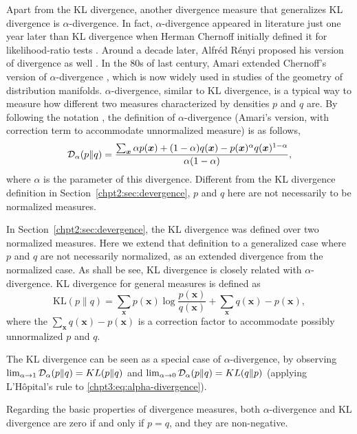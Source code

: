 Apart from the KL divergence, another divergence measure that generalizes KL divergence is $\alpha$-divergence. In fact, $\alpha$-divergence appeared in literature just one year later than KL divergence when Herman Chernoff initially defined it for likelihood-ratio tests \cite{Chernoff1952measure}. Around a decade later, Alfr\'ed R\'enyi proposed his version of divergence as well \cite{renyi1961entropy}. In the 80s of last century, Amari extended Chernoff's version of $\alpha$-divergence \cite{amari1982differential}, which is now widely used in studies of the geometry of distribution manifolds. 
$\alpha$-divergence, similar to KL divergence, is a typical way to measure how different two measures characterized by densities $p$ and $q$ are. By following the notation \cite{Zhu95informationgeometric}, the definition of $\alpha$-divergence (Amari's version, with correction term to accommodate unnormalized measure) is as follows,
\begin{equation}\label{chpt3:eq:alpha-divergence}
  \mathcal{D}_{\alpha}(p \| q ) = \frac{\sum_{\bm{x}} \alpha p(\bm{x}) + (1-\alpha) q (\bm{x}) - p(\bm{x})^{\alpha} q(\bm{x})^{1-\alpha}}{\alpha(1-\alpha)},
\end{equation}
where $\alpha$ is the parameter of this divergence. Different from the KL divergence definition in Section~\ref{chpt2:sec:devergence}, $p$ and $q$ here are not necessarily to be normalized measures.

In Section~\ref{chpt2:sec:devergence}, the KL divergence was defined over two normalized measures. Here we extend that definition to a generalized case where $p$ and $q$ are not necessarily normalized, as an extended divergence from the normalized case. As shall be see, KL divergence is closely related with $\alpha$-divergence. KL divergence for general measures is defined as
\begin{equation}\label{chpt3:eq:kl-divergence}
  \mathrm{KL}(p \| q) = \sum_{\bm{x}} p(\bm{x}) \log{\frac{p(\bm{x})}{q(\bm{x})}} + \sum_{\bm{x}} q(\bm{x}) - p(\bm{x}) ,
\end{equation}
where the $\sum_{\bm{x}} q(\bm{x}) - p(\bm{x})$ is a correction factor to accommodate possibly unnormalized $p$ and $q$.
\begin{remark}
  The KL divergence can be seen as a special case of $\alpha$-divergence, by observing $\lim_{\alpha \rightarrow 1}\mathcal{D}_{\alpha}(p \| q ) = KL(p\|q)$ and $\lim_{\alpha \rightarrow 0}\mathcal{D}_{\alpha}(p \| q ) = KL(q\|p)$ (applying L'H\^opital's rule to \eqref{chpt3:eq:alpha-divergence}).

  Regarding the basic properties of divergence measures, both $\alpha$-divergence and KL divergence are zero if and only if $p=q$, and they are non-negative. 
\end{remark}

